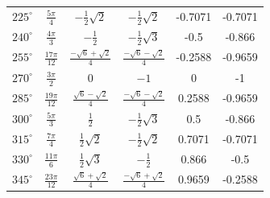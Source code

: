 \begin{minipage}{\linewidth}
\begin{tabular}{rcccS[table-format=1.4]S[table-format=1.4]}
\textcolor{\colred}{$\displaystyle 225^\circ$} & \textcolor{\colred}{$\displaystyle \frac{5\pi}{4}$} & \textcolor{\colred}{$\displaystyle -\frac{1}{2}\sqrt{2}$} & \textcolor{\colred}{$\displaystyle -\frac{1}{2}\sqrt{2}$} & \textcolor{\colred}{-0.7071} & \textcolor{\colred}{-0.7071} \\
\textcolor{\colblue}{$\displaystyle 240^\circ$} & \textcolor{\colblue}{$\displaystyle \frac{4\pi}{3}$} & \textcolor{\colblue}{$\displaystyle -\frac{1}{2}$} & \textcolor{\colblue}{$\displaystyle -\frac{1}{2}\sqrt{3}$} & \textcolor{\colblue}{-0.5} & \textcolor{\colblue}{-0.866} \\
\textcolor{\colgray}{$\displaystyle 255^\circ$} & \textcolor{\colgray}{$\displaystyle \frac{17\pi}{12}$} & \textcolor{\colgray}{$\displaystyle \frac{-\sqrt{6}+\sqrt{2}}{4}$} & \textcolor{\colgray}{$\displaystyle \frac{-\sqrt{6}-\sqrt{2}}{4}$} & \textcolor{\colgray}{-0.2588} & \textcolor{\colgray}{-0.9659} \\
\midrule
\textcolor{\colblack}{$\displaystyle 270^\circ$} & \textcolor{\colblack}{$\displaystyle \frac{3\pi}{2}$} & \textcolor{\colblack}{$\displaystyle 0$} & \textcolor{\colblack}{$\displaystyle -1$} &  &  \\
\midrule
\textcolor{\colgray}{$\displaystyle 285^\circ$} & \textcolor{\colgray}{$\displaystyle \frac{19\pi}{12}$} & \textcolor{\colgray}{$\displaystyle \frac{\sqrt{6}-\sqrt{2}}{4}$} & \textcolor{\colgray}{$\displaystyle \frac{-\sqrt{6}-\sqrt{2}}{4}$} & \textcolor{\colgray}{0.2588} & \textcolor{\colgray}{-0.9659} \\
\textcolor{\colblue}{$\displaystyle 300^\circ$} & \textcolor{\colblue}{$\displaystyle \frac{5\pi}{3}$} & \textcolor{\colblue}{$\displaystyle \frac{1}{2}$} & \textcolor{\colblue}{$\displaystyle -\frac{1}{2}\sqrt{3}$} & \textcolor{\colblue}{0.5} & \textcolor{\colblue}{-0.866} \\
\textcolor{\colred}{$\displaystyle 315^\circ$} & \textcolor{\colred}{$\displaystyle \frac{7\pi}{4}$} & \textcolor{\colred}{$\displaystyle \frac{1}{2}\sqrt{2}$} & \textcolor{\colred}{$\displaystyle -\frac{1}{2}\sqrt{2}$} & \textcolor{\colred}{0.7071} & \textcolor{\colred}{-0.7071} \\
\textcolor{\colblue}{$\displaystyle 330^\circ$} & \textcolor{\colblue}{$\displaystyle \frac{11\pi}{6}$} & \textcolor{\colblue}{$\displaystyle \frac{1}{2}\sqrt{3}$} & \textcolor{\colblue}{$\displaystyle -\frac{1}{2}$} & \textcolor{\colblue}{0.866} & \textcolor{\colblue}{-0.5} \\
\textcolor{\colgray}{$\displaystyle 345^\circ$} & \textcolor{\colgray}{$\displaystyle \frac{23\pi}{12}$} & \textcolor{\colgray}{$\displaystyle \frac{\sqrt{6}+\sqrt{2}}{4}$} & \textcolor{\colgray}{$\displaystyle \frac{-\sqrt{6}+\sqrt{2}}{4}$} & \textcolor{\colgray}{0.9659} & \textcolor{\colgray}{-0.2588} \\
\bottomrule
\end{tabular}

\renewcommand{\arraystretch}{1}
\end{minipage}

